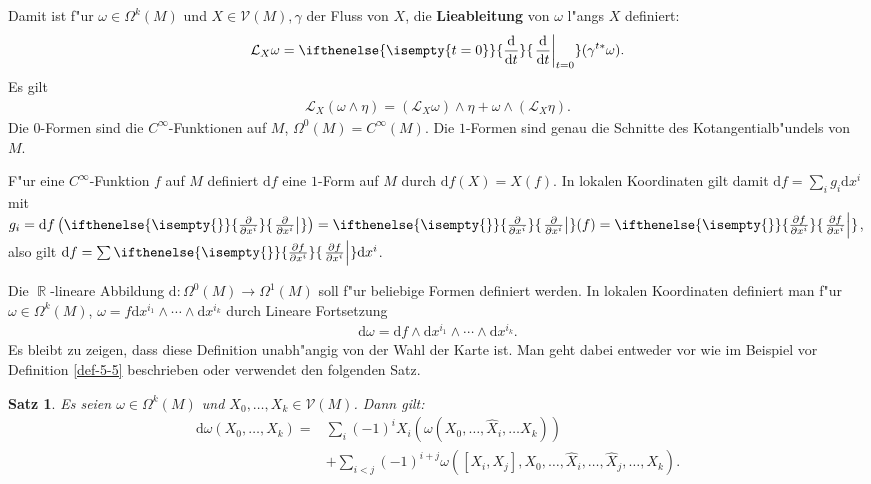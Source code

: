 \documentclass[paper=A4, twoside, chapterprefix=true, bibliography=totoc, headsepline]{scrbook}
\DeclareMathOperator{\R}{\mathbb{R}}
\newcommand{\dop}{\mathrm{d}}
\newcommand{\difffrac}[3][]{\ifthenelse{\isempty{#1}}{\frac{\dop #2}{\dop #3}}{\left. \frac{\dop #2}{\dop #3} \right|_{#1}}}
\newcommand{\pdifffrac}[3][]{\ifthenelse{\isempty{#1}}{\frac{\partial #2}{\partial #3}}{\left. \frac{\partial #2}{\partial #3} \right|_{#1}}}
\theoremstyle{plain}
\newtheorem{Satz}[Dfn]{Satz}
\theoremstyle{nonumberplain}
\theoremstyle{empty}
\theoremstyle{break}
\newcommand{\CmIndex}[2][]{\ifthenelse{\isempty{#1}}{\index{#2}}{\index{#1}}#2}
\newcommand{\CmMark}[2][]{\textbf{\CmIndex[#1]{#2}}}
\begin{document}
Damit ist f"ur $\omega \in \Omega^k(M)$ und $X \in \mathcal V(M), \gamma $ der Fluss von $X$, die \CmMark{Lieableitung} von $\omega$ l"angs $X$ definiert:
\begin{align*}
	\mathcal L_X\omega = \difffrac[t=0]{}{t}(\gamma^{t*}\omega).
\end{align*}
Es gilt 
\begin{align*}
	\mathcal L_X(\omega \wedge \eta) = (\mathcal L_X\omega) \wedge \eta + \omega \wedge (\mathcal L_X\eta).
\end{align*}
Die $0$-Formen sind die $C^{\infty}$-Funktionen auf $M$, $\Omega^0(M) = C^{\infty}(M)$. Die $1$-Formen sind genau die Schnitte des Kotangentialb"undels von $M$.

F"ur eine $C^{\infty}$-Funktion $f$ auf $M$ definiert $\dop f$ eine $1$-Form auf $M$ durch $\dop f (X) = X(f)$.
In lokalen Koordinaten gilt damit $\dop f = \sum_ig_i\dop x^i$ mit $g_i = \dop f\left(\pdifffrac{}{x^i}\right) = \pdifffrac{}{x^i}(f) = \pdifffrac{f}{x^i}$, also gilt $\dop f = \sum \pdifffrac{f}{x^i}\dop x^i$.

Die $\R$-lineare Abbildung $\dop \colon \Omega^0(M) \to \Omega^1(M)$ soll f"ur beliebige Formen definiert werden.
In lokalen Koordinaten definiert man f"ur $\omega \in \Omega^k(M)$, $\omega = f \dop x^{i_1} \wedge \cdots \wedge \dop x^{i_k}$ durch Lineare Fortsetzung
\begin{align*}
	\dop \omega = \dop f \wedge \dop x^{i_1} \wedge \cdots \wedge \dop x^{i_k}.
\end{align*}
Es bleibt zu zeigen, dass diese Definition unabh"angig von der Wahl der Karte ist. Man geht dabei entweder vor wie im Beispiel vor Definition \ref{def-5-5} beschrieben oder verwendet den folgenden Satz.

\begin{Satz}
  Es seien $\omega \in \Omega^k(M)$ und $X_0, \ldots, X_k \in \mathcal V(M)$.
  Dann gilt:
  \begin{align*}
    \dop \omega(X_0, \ldots, X_k) ={} & \sum_i(-1)^iX_i(\omega(X_0, \ldots, \hat X_i, \ldots X_k)) \\
    & + \sum_{i<j}(-1)^{i+j}\omega([X_i,X_j], X_0, \ldots, \hat X_i, \ldots, \hat X_j, \ldots, X_k).
  \end{align*}
\end{Satz}
\end{document}
